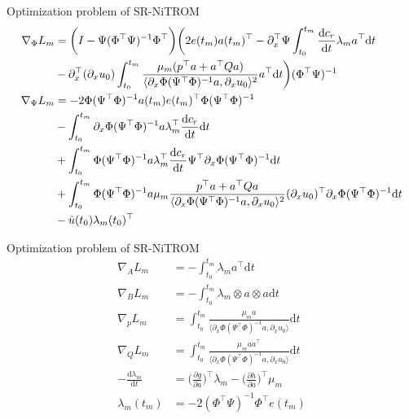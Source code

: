 \documentclass[presentation]{beamer}
\begin{document}
\begin{frame}[label={sec:orge37b609}]{Optimization problem of SR-NiTROM}
\begin{subequations}
\begin{align}
\nabla_{\Phi}L_{m} &= \bigg(I - \Psi(\Phi^{\top}\Psi)^{-1}\Phi^{\top}\bigg)\bigg(2e(t_{m})a(t_{m})^{\top} - \partial_{x}^{\top}\Psi\int_{t_{0}}^{t_{m}}\frac{\mathrm{d}c_{r}}{\mathrm{d}t}\lambda_{m}a^{\top}\mathrm{d}t\notag\\
               &- \partial_{x}^{\top}(\partial_{x}u_{0})\int_{t_{0}}^{t_{m}}\frac{\mu_{m}(p^{\top}a + a^{\top}Qa)}{\langle\partial_{x}\Phi(\Psi^{\top}\Phi)^{-1}a, \partial_{x}u_{0}\rangle^{2}}a^{\top}\mathrm{d}t\bigg)(\Phi^{\top}\Psi)^{-1}\\
\nabla_{\Psi}L_{m} &= -2\Phi(\Psi^{\top}\Phi)^{-1}a(t_{m})e(t_{m})^{\top}\Phi(\Psi^{\top}\Phi)^{-1}\notag\\
               &- \int_{t_{0}}^{t_{m}}\partial_{x}\Phi(\Psi^{\top}\Phi)^{-1}a\lambda_{m}^{\top}\frac{\mathrm{d}c_{r}}{\mathrm{d}t}\mathrm{d}t\notag\\
               &+ \int_{t_{0}}^{t_{m}}\Phi(\Psi^{\top}\Phi)^{-1}a\lambda_{m}^{\top}\frac{\mathrm{d}c_{r}}{\mathrm{d}t}\Psi^{\top}\partial_{x}\Phi(\Psi^{\top}\Phi)^{-1}\mathrm{d}t\notag\\
               &+ \int_{t_{0}}^{t_{m}}\Phi(\Psi^{\top}\Phi)^{-1}a\mu_{m}\frac{p^{\top}a + a^{\top}Qa}{\langle\partial_{x}\Phi(\Psi^{\top}\Phi)^{-1}a, \partial_{x}u_{0}\rangle^{2}}(\partial_{x}u_{0})^{\top}\partial_{x}\Phi(\Psi^{\top}\Phi)^{-1}\mathrm{d}t\notag\\
               &- \hat{u}(t_{0})\lambda_{m}(t_{0})^{\top}        
\end{align}
\end{subequations}
\end{frame}

\begin{frame}[label={sec:orge8217c9}]{Optimization problem of SR-NiTROM}
\begin{subequations}
\begin{align}
\nabla_{A}L_{m} &= -\int_{t_{0}}^{t_{m}}\lambda_{m}a^{\top}\mathrm{d}t\\
\nabla_{B}L_{m} &= -\int_{t_{0}}^{t_{m}}\lambda_{m}\otimes a\otimes a\mathrm{d}t\\
\nabla_{p}L_{m} &= \int_{t_{0}}^{t_{m}}\frac{\mu_{m}a}{\langle\partial_{x}\Phi(\Psi^{\top}\Phi)^{-1}a, \partial_{x}u_{0}\rangle}\mathrm{d}t\\
\nabla_{Q}L_{m} &= \int_{t_{0}}^{t_{m}}\frac{\mu_{m}aa^{\top}}{\langle\partial_{x}\Phi(\Psi^{\top}\Phi)^{-1}a, \partial_{x}u_{0}\rangle}\mathrm{d}t\\       
-\frac{\mathrm{d}\lambda_{m}}{\mathrm{d}t} &= \bigg(\frac{\partial g}{\partial a}\bigg)^{\top}\lambda_{m} - \bigg(\frac{\partial h}{\partial a}\bigg)^{\top}\mu_{m}\\
\lambda_{m}(t_{m}) &= -2(\Phi^{\top}\Psi)^{-1}\Phi^{\top}e(t_{m})
\end{align}
\end{subequations}
\end{frame}
\end{document}
